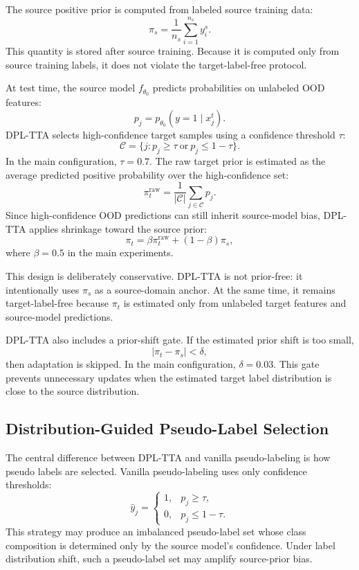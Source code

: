 The source positive prior is computed from labeled source training data:
\[
\pi_s = \frac{1}{n_s}\sum_{i=1}^{n_s} y_i^s.
\]
This quantity is stored after source training. Because it is computed only from source training labels, it does not violate the target-label-free protocol.

At test time, the source model $f_{\theta_0}$ predicts probabilities on unlabeled OOD features:
\[
p_j = p_{\theta_0}(y=1 \mid x_j^t).
\]
DPL-TTA selects high-confidence target samples using a confidence threshold $\tau$:
\[
\mathcal{C} = \{j : p_j \geq \tau \ \text{or} \ p_j \leq 1-\tau\}.
\]
In the main configuration, $\tau=0.7$. The raw target prior is estimated as the average predicted positive probability over the high-confidence set:
\[
\pi_t^{\mathrm{raw}} = \frac{1}{|\mathcal{C}|}\sum_{j \in \mathcal{C}} p_j.
\]
Since high-confidence OOD predictions can still inherit source-model bias, DPL-TTA applies shrinkage toward the source prior:
\[
\pi_t = \beta \pi_t^{\mathrm{raw}} + (1-\beta)\pi_s,
\]
where $\beta=0.5$ in the main experiments.

This design is deliberately conservative. DPL-TTA is not prior-free: it intentionally uses $\pi_s$ as a source-domain anchor. At the same time, it remains target-label-free because $\pi_t$ is estimated only from unlabeled target features and source-model predictions.

DPL-TTA also includes a prior-shift gate. If the estimated prior shift is too small,
\[
|\pi_t - \pi_s| < \delta,
\]
then adaptation is skipped. In the main configuration, $\delta=0.03$. This gate prevents unnecessary updates when the estimated target label distribution is close to the source distribution.

\subsection{Distribution-Guided Pseudo-Label Selection}

The central difference between DPL-TTA and vanilla pseudo-labeling is how pseudo labels are selected. Vanilla pseudo-labeling uses only confidence thresholds:
\[
\hat{y}_j =
\begin{cases}
1, & p_j \geq \tau, \\
0, & p_j \leq 1-\tau.
\end{cases}
\]
This strategy may produce an imbalanced pseudo-label set whose class composition is determined only by the source model's confidence. Under label distribution shift, such a pseudo-label set may amplify source-prior bias.

